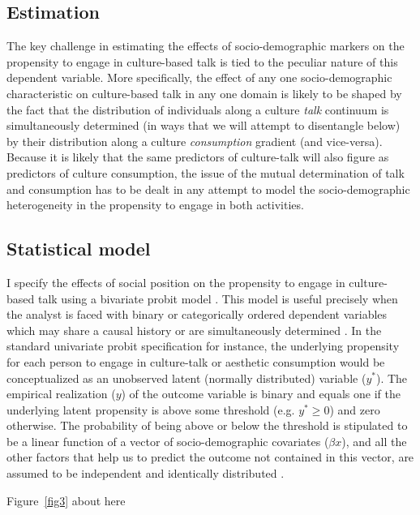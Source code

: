 \documentclass[11pt]{article}
\begin{document}
\subsection{Estimation}
The key challenge in estimating the effects of socio-demographic markers on the propensity to engage in culture-based talk is tied to the peculiar nature of this dependent variable.  More specifically, the effect of any one socio-demographic characteristic on culture-based talk in any one domain is likely to be shaped by the fact that the distribution of individuals along a culture \emph{talk} continuum is simultaneously determined (in ways that we will attempt to disentangle below) by their distribution along a culture \emph{consumption} gradient (and vice-versa). Because it is likely that the same predictors of culture-talk will also figure as predictors of culture consumption, the issue of the mutual determination of talk and consumption has to be dealt in any attempt to model the socio-demographic heterogeneity in the propensity to engage in both activities.  

\subsection{Statistical model}
I specify the effects of social position on the propensity to engage in culture-based talk using a bivariate probit model \citep{ greene98}. This model is useful precisely when the analyst is faced with binary or categorically ordered dependent variables which may share a causal history or are simultaneously determined \citep{calhoun89}.  In the standard univariate probit specification for instance, the underlying propensity for each person to engage in culture-talk or aesthetic consumption would be conceptualized as an unobserved latent (normally distributed) variable ($y^{*}$).  The empirical realization ($y$) of the outcome variable is binary and equals one if the underlying latent propensity is above some threshold (e.g. $y^{*} \geq 0$) and zero otherwise. The probability of being above or below the threshold is stipulated to be a linear function of a vector of socio-demographic covariates ($\beta x$), and all the other factors that help us to predict the outcome not contained in this vector, are assumed to be independent and identically distributed \citep{long_freese06}.

\begin{center}
	Figure~\ref{fig3} about here
\end{center}
\end{document}
